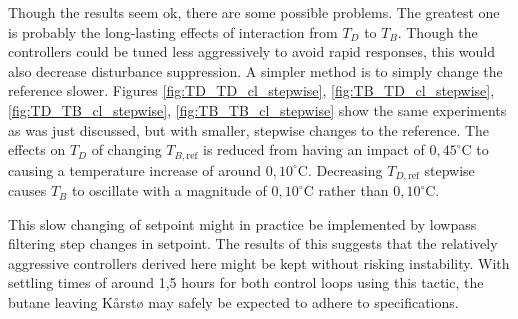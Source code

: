 \documentclass[12pt]{article}
\begin{document}
Though the results seem ok, there are some possible problems. The greatest one is probably the long-lasting effects of interaction from $T_D$ to $T_B$. Though the controllers could be tuned less aggressively to avoid rapid responses, this would also decrease disturbance suppression. A simpler method is to simply change the reference slower. Figures \ref{fig:TD_TD_cl_stepwise}, \ref{fig:TB_TD_cl_stepwise}, \ref{fig:TD_TB_cl_stepwise}, \ref{fig:TB_TB_cl_stepwise} show the same experiments as was just discussed, but with smaller, stepwise changes to the reference. The effects on $T_D$ of changing $T_{B , \textrm{ref}}$ is reduced from having an impact of $0,45^\circ$C to causing a temperature increase of around $0,10^\circ$C. Decreasing $T_{D , \textrm{ref}}$ stepwise causes $T_B$ to oscillate with a magnitude of $0,10^\circ$C rather than $0,10^\circ$C.

This slow changing of setpoint might in practice be implemented by lowpass filtering step changes in setpoint. The results of this suggests that the relatively aggressive controllers derived here might be kept without risking instability. With settling times of around 1,5 hours for both control loops using this tactic, the butane leaving Kårstø may safely be expected to adhere to specifications.
\end{document}
